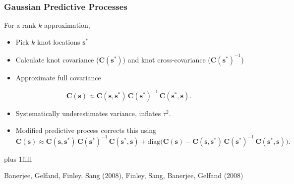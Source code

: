 \documentclass[t]{beamer}\usepackage[]{graphicx}\usepackage[]{color}
\newcommand{\vvfill}{\vskip0pt plus 1filll}
\begin{document}

\begin{frame}
\frametitle{Gaussian Predictive Processes}

For a rank $k$ approximation,

\begin{itemize}
\item Pick $k$ knot locations $\bm{s}^*$
\item Calculate knot covariance ($\bm{C}(\bm{s}^*)$) and knot cross-covariance ($\bm{C}(\bm{s}^*)^{-1}$)
\item Approximate full covariance
\end{itemize}
%
\[\bm{C}(\bm{s}) \approx \bm{C}(\bm{s},\bm{s}^*) \, \bm{C}(\bm{s}^*)^{-1} \, \bm{C}(\bm{s}^*,\bm{s}).\]


\begin{itemize}
\item Systematically underestimates variance, inflates $\tau^2$. 

\item Modified predictive process corrects this using 
%
\vspace{1mm}
{\small
\[
\bm{C}(\bm{s}) \approx
\bm{C}(\bm{s},\bm{s}^*) \, \bm{C}(\bm{s}^*)^{-1} \, \bm{C}(\bm{s}^*,\bm{s}) + \text{diag}\Big(\bm{C}(\bm{s}) - \bm{C}(\bm{s},\bm{s}^*) \, \bm{C}(\bm{s}^*)^{-1} \, \bm{C}(\bm{s}^*,\bm{s})\Big).
\]
}
\end{itemize}

\vvfill

{\footnotesize
\begin{center}
Banerjee, Gelfand, Finley, Sang (2008), Finley, Sang, Banerjee, Gelfand (2008)
\end{center}
}
\end{frame}

\end{document}
